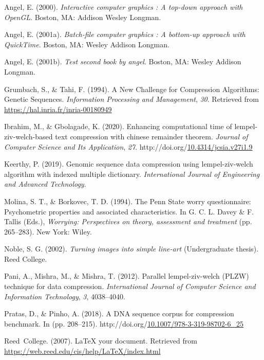 \documentclass[12pt,twoside]{reedthesis}
\newlength{\cslhangindent}
\newenvironment{CSLReferences}[2] %
 {%
  \setlength{\parindent}{0pt}
  \ifodd #1 \everypar{\setlength{\hangindent}{\cslhangindent}}\ignorespaces\fi
  \ifnum #2 > 0
  \setlength{\parskip}{#2\baselineskip}
  \fi
 }%
 {}
\begin{document}
\begin{CSLReferences}{1}{0}
\leavevmode{}%
Angel, E. (2000). \emph{Interactive computer graphics : A top-down approach with OpenGL}. Boston, MA: Addison Wesley Longman.

\leavevmode{}%
Angel, E. (2001a). \emph{Batch-file computer graphics : A bottom-up approach with QuickTime}. Boston, MA: Wesley Addison Longman.

\leavevmode{}%
Angel, E. (2001b). \emph{Test second book by angel}. Boston, MA: Wesley Addison Longman.

\leavevmode{}%
Grumbach, S., \& Tahi, F. (1994). {A New Challenge for Compression Algorithms: Genetic Sequences}. \emph{{Information Processing and Management}}, \emph{30}. Retrieved from \url{https://hal.inria.fr/inria-00180949}

\leavevmode{}%
Ibrahim, M., \& Gbolagade, K. (2020). Enhancing computational time of lempel-ziv-welch-based text compression with chinese remainder theorem. \emph{Journal of Computer Science and Its Application}, \emph{27}. http://doi.org/\href{https://doi.org/10.4314/jcsia.v27i1.9}{10.4314/jcsia.v27i1.9}

\leavevmode{}%
Keerthy, P. (2019). Genomic sequence data compression using lempel-ziv-welch algorithm with indexed multiple dictionary. \emph{International Journal of Engineering and Advanced Technology}.

\leavevmode{}%
Molina, S. T., \& Borkovec, T. D. (1994). The {P}enn {S}tate worry questionnaire: Psychometric properties and associated characteristics. In G. C. L. Davey \& F. Tallis (Eds.), \emph{Worrying: Perspectives on theory, assessment and treatment} (pp. 265--283). New York: Wiley.

\leavevmode{}%
Noble, S. G. (2002). \emph{Turning images into simple line-art} (Undergraduate thesis). Reed College.

\leavevmode{}%
Pani, A., Mishra, M., \& Mishra, T. (2012). Parallel lempel-ziv-welch (PLZW) technique for data compression. \emph{International Journal of Computer Science and Information Technology}, \emph{3}, 4038--4040.

\leavevmode{}%
Pratas, D., \& Pinho, A. (2018). A DNA sequence corpus for compression benchmark. In (pp. 208--215). http://doi.org/\href{https://doi.org/10.1007/978-3-319-98702-6_25}{10.1007/978-3-319-98702-6\_25}

\leavevmode{}%
Reed~College. (2007). LaTeX your document. Retrieved from \url{https://web.reed.edu/cis/help/LaTeX/index.html}

\end{CSLReferences}

\end{document}
